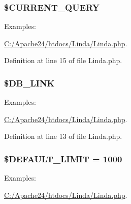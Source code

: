 \subsubsection[{\$\+C\+U\+R\+R\+E\+N\+T\+\_\+\+Q\+U\+E\+R\+Y}]{\setlength{\rightskip}{0pt plus 5cm}\$C\+U\+R\+R\+E\+N\+T\+\_\+\+Q\+U\+E\+R\+Y}\label{class_linda_a5ed9b689dc54a1e48103d904af6885a5}
\begin{Desc}
\item[Examples\+: ]\par
\hyperlink{_c_1_2_apache24_2htdocs_2_linda_2_linda_8php-example}{C\+:/\+Apache24/htdocs/\+Linda/\+Linda.\+php}.\end{Desc}


Definition at line 15 of file Linda.\+php.

\hypertarget{class_linda_a11c2781ac527a1c951d9035f2d0197cc}{}
\subsubsection[{\$\+D\+B\+\_\+\+L\+I\+N\+K}]{\setlength{\rightskip}{0pt plus 5cm}\$D\+B\+\_\+\+L\+I\+N\+K\hspace{0.3cm}{\ttfamily [protected]}}\label{class_linda_a11c2781ac527a1c951d9035f2d0197cc}
\begin{Desc}
\item[Examples\+: ]\par
\hyperlink{_c_1_2_apache24_2htdocs_2_linda_2_linda_8php-example}{C\+:/\+Apache24/htdocs/\+Linda/\+Linda.\+php}.\end{Desc}


Definition at line 13 of file Linda.\+php.

\hypertarget{class_linda_a97365f1875db5efbdefc5faa71249ff1}{}
\subsubsection[{\$\+D\+E\+F\+A\+U\+L\+T\+\_\+\+L\+I\+M\+I\+T}]{\setlength{\rightskip}{0pt plus 5cm}\$D\+E\+F\+A\+U\+L\+T\+\_\+\+L\+I\+M\+I\+T = 1000\hspace{0.3cm}{\ttfamily [protected]}}\label{class_linda_a97365f1875db5efbdefc5faa71249ff1}
\begin{Desc}
\item[Examples\+: ]\par
\hyperlink{_c_1_2_apache24_2htdocs_2_linda_2_linda_8php-example}{C\+:/\+Apache24/htdocs/\+Linda/\+Linda.\+php}.\end{Desc}



